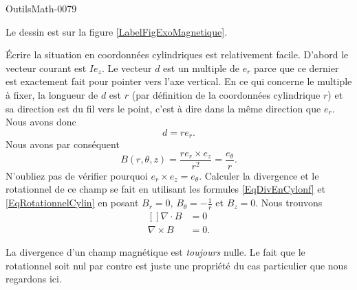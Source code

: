 
\begin{corrige}{OutilsMath-0079}

    Le dessin est sur la figure \ref{LabelFigExoMagnetique}.
    \newcommand{\CaptionFigExoMagnetique}{La façon naturelle de décrire la situation sont les coordonnées cylindriques.}
    

    Écrire la situation en coordonnées cylindriques est relativement facile. D'abord le vecteur courant est $Ie_z$. Le vecteur $d$ est un multiple de $e_r$ parce que ce dernier est exactement fait pour pointer vers l'axe vertical. En ce qui concerne le multiple à fixer, la longueur de $d$ est $r$ (par définition de la coordonnées cylindrique $r$) et sa direction est du fil vers le point, c'est à dire dans la même direction que $e_r$. Nous avons donc
    \begin{equation}
        d=re_r.
    \end{equation}
    Nous avons par conséquent
    \begin{equation}
        B(r,\theta,z)=\frac{ re_r\times e_z }{ r^2 }=\frac{ e_{\theta} }{ r }.
    \end{equation}
    N'oubliez pas de vérifier pourquoi $e_r\times e_z=e_{\theta}$. Calculer la divergence et le rotationnel de ce champ se fait en utilisant les formules \eqref{EqDivEnCylonf} et \eqref{EqRotationnelCylin} en posant $B_r=0$, $B_{\theta}=-\frac{1}{ r }$ et $B_z=0$. Nous trouvons
    \begin{equation}
        \begin{aligned}[]
            \nabla\cdot B&=0\\
            \nabla\times B&=0.
        \end{aligned}
    \end{equation}
    
    \begin{remark}
        La divergence d'un champ magnétique est \emph{toujours} nulle. Le fait que le rotationnel soit nul par contre est juste une propriété du cas particulier que nous regardons ici.
    \end{remark}

\end{corrige}
